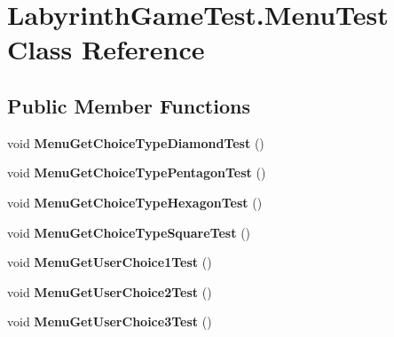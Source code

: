 \hypertarget{class_labyrinth_game_test_1_1_menu_test}{\section{Labyrinth\+Game\+Test.\+Menu\+Test Class Reference}
\label{class_labyrinth_game_test_1_1_menu_test}
}
\subsection*{Public Member Functions}
\begin{DoxyCompactItemize}
\item 
\hypertarget{class_labyrinth_game_test_1_1_menu_test_aa0e27f453254a81aebeb5a42af28641d}{void {\bfseries Menu\+Get\+Choice\+Type\+Diamond\+Test} ()}\label{class_labyrinth_game_test_1_1_menu_test_aa0e27f453254a81aebeb5a42af28641d}

\item 
\hypertarget{class_labyrinth_game_test_1_1_menu_test_a1629560e75f4e655088260f3147b2373}{void {\bfseries Menu\+Get\+Choice\+Type\+Pentagon\+Test} ()}\label{class_labyrinth_game_test_1_1_menu_test_a1629560e75f4e655088260f3147b2373}

\item 
\hypertarget{class_labyrinth_game_test_1_1_menu_test_abbcecbffeff90f67e45a2383b7d9ebc1}{void {\bfseries Menu\+Get\+Choice\+Type\+Hexagon\+Test} ()}\label{class_labyrinth_game_test_1_1_menu_test_abbcecbffeff90f67e45a2383b7d9ebc1}

\item 
\hypertarget{class_labyrinth_game_test_1_1_menu_test_ad46d78ac5a9ee38d3e1751837bf2f803}{void {\bfseries Menu\+Get\+Choice\+Type\+Square\+Test} ()}\label{class_labyrinth_game_test_1_1_menu_test_ad46d78ac5a9ee38d3e1751837bf2f803}

\item 
\hypertarget{class_labyrinth_game_test_1_1_menu_test_ad6d29162f529492326a034a77de9d8d7}{void {\bfseries Menu\+Get\+User\+Choice1\+Test} ()}\label{class_labyrinth_game_test_1_1_menu_test_ad6d29162f529492326a034a77de9d8d7}

\item 
\hypertarget{class_labyrinth_game_test_1_1_menu_test_a869de3700632de4d45add3edd8052c88}{void {\bfseries Menu\+Get\+User\+Choice2\+Test} ()}\label{class_labyrinth_game_test_1_1_menu_test_a869de3700632de4d45add3edd8052c88}

\item 
\hypertarget{class_labyrinth_game_test_1_1_menu_test_acb105bd68e81232c3a7a1766bade610b}{void {\bfseries Menu\+Get\+User\+Choice3\+Test} ()}\label{class_labyrinth_game_test_1_1_menu_test_acb105bd68e81232c3a7a1766bade610b}


\end{DoxyCompactItemize}
